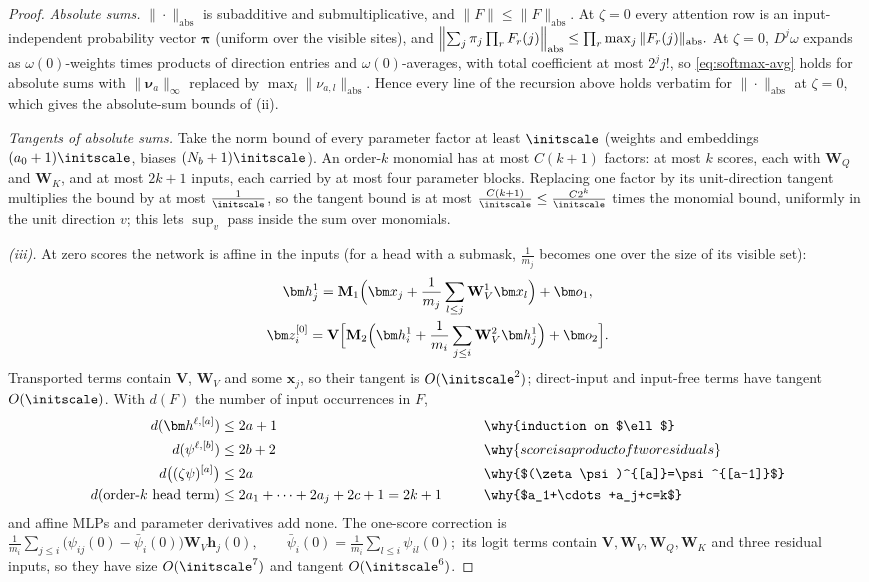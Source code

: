 \begin{proof}
\emph{Absolute sums.} $\|\cdot\|_{\mathrm{abs}}$ is subadditive and submultiplicative, and $\|F\|\le\|F\|_{\mathrm{abs}}$. At $\zeta=0$ every attention row is an
input-independent probability vector $\bm\pi$ (uniform over the visible sites), and
 $\Bigl\|\textstyle\sum_j\pi_j\prod_rF_r(j)\Bigr\|_{\mathrm{abs}}\le\prod_r\max_j\|F_r(j)\|_{\mathrm{abs}} .$ 
At $\zeta=0$, $D^j\omega$ expands as $\omega(0)$-weights times products of direction entries and $\omega(0)$-averages, with total coefficient at most $2^jj!$,
so \cref{eq:softmax-avg} holds for absolute sums with $\|\bm\nu_a\|_\infty$ replaced by $\max_l\|\nu_{a,l}\|_{\mathrm{abs}}$. Hence every line of the recursion
above holds verbatim for $\|\cdot\|_{\mathrm{abs}}$ at $\zeta=0$, which gives the absolute-sum bounds of (ii).

\emph{Tangents of absolute sums.} Take the norm bound of every parameter factor at least $\initscale$ (weights and embeddings $(a_0+1)\initscale$,
biases $(N_b+1)\initscale$). An order-$k$ monomial has at most $C(k+1)$ factors: at most $k$ scores, each with $\mathbf W_Q$ and $\mathbf W_K$, and at
most $2k+1$ inputs, each carried by at most four parameter blocks. Replacing one factor by its unit-direction tangent multiplies the bound by at
most $\frac{1}{\initscale}$, so the tangent bound is at most $\frac{C(k+1)}{\initscale}\le\frac{C2^k}{\initscale}$ times the monomial bound, uniformly in the unit direction
$v$; this lets $\sup_v$ pass inside the sum over monomials.

\emph{(iii).} At zero scores the network is affine in the inputs (for a head with a submask, $\frac{1}{m_j}$ becomes one over the size of its
visible set):
\begin{gather*}
 \bm h^1_j=\mathbf M_1\Bigl(\bm x_j+\frac{1}{m_j}\sum_{l\le j}\mathbf W^1_V\bm x_l\Bigr)+\bm o_1,\\
 \bm z^{[0]}_i=\mathbf V\Bigl[\mathbf M_2\Bigl(\bm h^1_i+\frac{1}{m_i}\sum_{j\le i}\mathbf W^2_V\bm h^1_j\Bigr)+\bm o_2\Bigr].
\end{gather*}
Transported terms contain $\mathbf V$, $\mathbf W_V$ and some $\bm x_j$, so their tangent is $O(\initscale^2)$; direct-input and input-free terms have tangent $O(\initscale)$.
With $d(F)$ the number of input occurrences in $F$,
\begin{alignat*}{2}
 d(\bm h^{\ell,[a]})&\le2a+1 &\qquad& \why{induction on $\ell$}\\
 d(\psi^{\ell,[b]})&\le2b+2 && \why{score is a product of two residuals}\\
 d\bigl((\zeta\psi)^{[a]}\bigr)&\le2a && \why{$(\zeta\psi)^{[a]}=\psi^{[a-1]}$}\\
 d(\text{order-$k$ head term})&\le2a_1+\cdots+2a_j+2c+1=2k+1 && \why{$a_1+\cdots+a_j+c=k$}
\end{alignat*}
and affine MLPs and parameter derivatives add none. The one-score correction is
 $\frac{1}{m_i}\sum_{j\le i}\bigl(\psi_{ij}(0)-\bar\psi_i(0)\bigr)\mathbf W_V\bm h_j(0),\qquad \bar\psi_i(0)=\frac{1}{m_i}\sum_{l\le i}\psi_{il}(0);$ 
its logit terms contain $\mathbf V,\mathbf W_V,\mathbf W_Q,\mathbf W_K$ and three residual inputs, so they have size $O(\initscale^7)$ and tangent $O(\initscale^6)$.

\end{proof}

